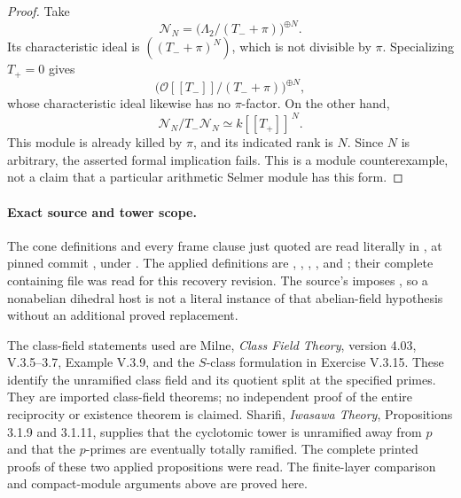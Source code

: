 \begin{proof}
Take
\[
          \mathcal N_N=
               \bigl(\Lambda_2/(T_-+\pi)\bigr)^{\oplus N}.
                                                               \tag{G74.15}
\]
Its characteristic ideal is \(((T_-+\pi)^N)\), which is not
divisible by \(\pi\).  Specializing \(T_+=0\) gives
\[
       \bigl(\mathcal O[[T_-]]/(T_-+\pi)\bigr)^{\oplus N},
\]
whose characteristic ideal likewise has no \(\pi\)-factor.
On the other hand,
\[
        \mathcal N_N/T_-\mathcal N_N
                          \simeq k[[T_+]]^{\,N}.
                                                               \tag{G74.16}
\]
This module is already killed by \(\pi\), and its indicated rank
is \(N\).  Since \(N\) is arbitrary, the asserted formal
implication fails.  This is a module counterexample, not a
claim that a particular arithmetic Selmer module has this form.
\end{proof}

\paragraph{Exact source and tower scope.}
The cone definitions and every frame clause just quoted are read
literally in , at pinned commit
, under
.
The applied definitions are ,
, , ,
and ; their complete containing file was read
for this recovery revision.
The source's  imposes
, so a nonabelian dihedral host is not a literal
instance of that abelian-field hypothesis without an additional
proved replacement.

The class-field statements used are Milne,
\emph{Class Field Theory}, version 4.03, V.3.5--3.7,
Example V.3.9, and the \(S\)-class formulation in Exercise V.3.15.
These identify the unramified class field and its quotient split
at the specified primes.  They are imported class-field theorems;
no independent proof of the entire reciprocity or existence
theorem is claimed.  Sharifi, \emph{Iwasawa Theory},
Propositions 3.1.9 and 3.1.11, supplies that the cyclotomic tower
is unramified away from \(p\) and that the \(p\)-primes are
eventually totally ramified.  The complete printed proofs of
these two applied propositions were read.  The finite-layer
comparison and compact-module arguments above are proved here.

